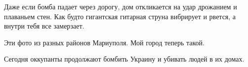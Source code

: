 Даже если бомба падает через дорогу, дом  откликается на удар  дрожанием и
плаваньем стен. Как будто гигантская  гитарная струна вибрирует и рвется, а
внутри тебя все замерзает. 

Эти фото из разных районов Мариуполя. Мой город теперь такой.

Сегодня оккупанты  продолжают бомбить Украину и убивать людей в их домах.


